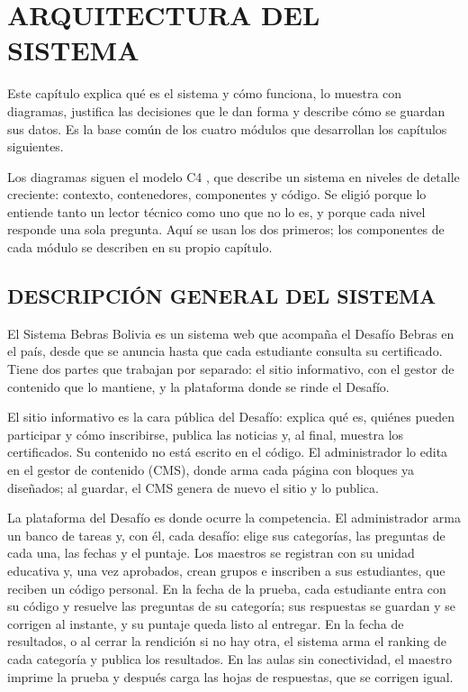 \chapter{ARQUITECTURA DEL SISTEMA}

Este capítulo explica qué es el sistema y cómo funciona, lo muestra con diagramas, justifica las decisiones que le dan forma y describe cómo se guardan sus datos. Es la base común de los cuatro módulos que desarrollan los capítulos siguientes.

Los diagramas siguen el modelo C4 \parencite{brownc4}, que describe un sistema en niveles de detalle creciente: contexto, contenedores, componentes y código. Se eligió porque lo entiende tanto un lector técnico como uno que no lo es, y porque cada nivel responde una sola pregunta. Aquí se usan los dos primeros; los componentes de cada módulo se describen en su propio capítulo.

\section{DESCRIPCIÓN GENERAL DEL SISTEMA}

El Sistema Bebras Bolivia es un sistema web que acompaña el Desafío Bebras en el país, desde que se anuncia hasta que cada estudiante consulta su certificado. Tiene dos partes que trabajan por separado: el sitio informativo, con el gestor de contenido que lo mantiene, y la plataforma donde se rinde el Desafío.

El sitio informativo es la cara pública del Desafío: explica qué es, quiénes pueden participar y cómo inscribirse, publica las noticias y, al final, muestra los certificados. Su contenido no está escrito en el código. El administrador lo edita en el gestor de contenido (CMS), donde arma cada página con bloques ya diseñados; al guardar, el CMS genera de nuevo el sitio y lo publica.

La plataforma del Desafío es donde ocurre la competencia. El administrador arma un banco de tareas y, con él, cada desafío: elige sus categorías, las preguntas de cada una, las fechas y el puntaje. Los maestros se registran con su unidad educativa y, una vez aprobados, crean grupos e inscriben a sus estudiantes, que reciben un código personal. En la fecha de la prueba, cada estudiante entra con su código y resuelve las preguntas de su categoría; sus respuestas se guardan y se corrigen al instante, y su puntaje queda listo al entregar. En la fecha de resultados, o al cerrar la rendición si no hay otra, el sistema arma el ranking de cada categoría y publica los resultados. En las aulas sin conectividad, el maestro imprime la prueba y después carga las hojas de respuestas, que se corrigen igual.

